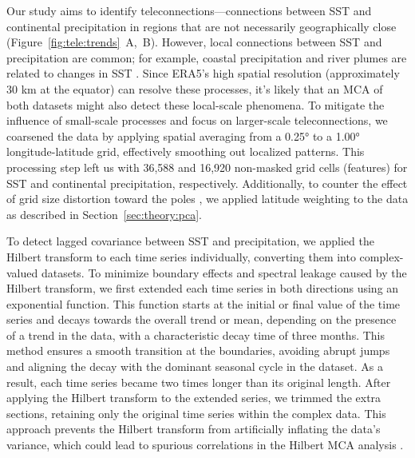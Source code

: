 Our study aims to identify teleconnections---connections between SST and continental precipitation in regions that are not necessarily geographically close (Figure~\ref{fig:tele:trends}~A,~B). However, local connections between SST and precipitation are common; for example, coastal precipitation and river plumes are related to changes in SST \cite[e.g.][]{lenderink_intense_2009}. Since ERA5's high spatial resolution (approximately 30 km at the equator) can resolve these processes, it's likely that an MCA of both datasets might also detect these local-scale phenomena. To mitigate the influence of small-scale processes and focus on larger-scale teleconnections, we coarsened the data by applying spatial averaging from a \ang{0.25} to a \ang{1.00} longitude-latitude grid, effectively smoothing out localized patterns. This processing step left us with 36,588 and 16,920 non-masked grid cells (features) for SST and continental precipitation, respectively. Additionally, to counter the effect of grid size distortion toward the poles \cite{north_latitude_1982}, we applied latitude weighting to the data as described in Section~\ref{sec:theory:pca}.

To detect lagged covariance between SST and precipitation, we applied the Hilbert transform to each time series individually, converting them into complex-valued datasets. To minimize boundary effects and spectral leakage caused by the Hilbert transform, we first extended each time series in both directions using an exponential function. This function starts at the initial or final value of the time series and decays towards the overall trend or mean, depending on the presence of a trend in the data, with a characteristic decay time of three months. This method ensures a smooth transition at the boundaries, avoiding abrupt jumps and aligning the decay with the dominant seasonal cycle in the dataset. As a result, each time series became two times longer than its original length. After applying the Hilbert transform to the extended series, we trimmed the extra sections, retaining only the original time series within the complex data. This approach prevents the Hilbert transform from artificially inflating the data's variance, which could lead to spurious correlations in the Hilbert MCA analysis \cite{rieger_lagged_2021}.

